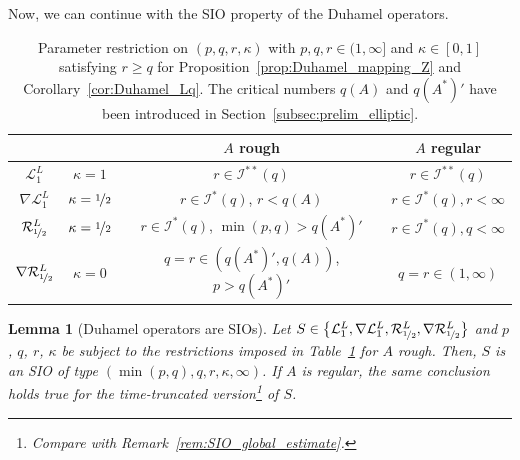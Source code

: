 \documentclass[11pt, leqno]{amsart}
\newtheorem{lemma}[theorem]{Lemma}
\theoremstyle{definition}
\newcommand{\Sol}{\mathcal{R}}
\newcommand{\Soll}{\mathcal{L}}
\newcommand{\SobSet}{\mathcal{I}}
\begin{document}
	Now, we can continue with the SIO property of the Duhamel operators.

	\begin{table}
		\centering
		\begin{tabular}{ c | c |c c }
			& & $A$ rough & $A$ regular \\
			\hline
			$\Soll^L_1$ & $\kappa = 1$ & $r \in \SobSet^{**}(q)$ & $r \in \SobSet^{**}(q)$ \\
			$\nabla \Soll^L_1$ & $\kappa = \nicefrac{1}{2}$ & $r \in \SobSet^{*}(q)$, $r < q(A)$ & $r \in \SobSet^{*}(q), {r<\infty}$ \\
			$\Sol^L_{\nicefrac{1}{2}}$ & $\kappa = \nicefrac{1}{2}$ & $r \in \SobSet^*(q)$, $\min(p,q) > q(A^*)'$ & $r \in \SobSet^*(q), {q<\infty}$ \\
			$\nabla \Sol^L_{\nicefrac{1}{2}}$ & $\kappa = 0$ & $q = r \in (q(A^*)', q(A))$, $p > q(A^*)'$ & $q = r \in (1,\infty)$ \\
		\end{tabular}
		\vspace{1em}
		\caption{Parameter restriction on $(p, q, r, \kappa)$ with $p,q,r \in (1,\infty]$ and $\kappa \in [0,1]$ satisfying $r \geq q$ for Proposition~\ref{prop:Duhamel_mapping_Z} and Corollary~\ref{cor:Duhamel_Lq}. {The critical numbers $q(A)$ and $q(A^*)'$ have been introduced in Section~\ref{subsec:prelim_elliptic}.}}
		\label{tab:Duhamel_Sobolev}
	\end{table}

	\begin{lemma}[Duhamel operators are SIOs]
		\label{lem:Duhamel_is_SIO}
		Let $S \in \bigl\{ \Soll^L_1, \nabla \Soll^L_1, \Sol^L_{\nicefrac{1}{2}}, \nabla \Sol^L_{\nicefrac{1}{2}} \bigr\}$ and $p$, $q$, $r$, $\kappa$ be subject to the restrictions imposed in Table~\ref{tab:Duhamel_Sobolev} for $A$ rough. Then, $S$ is an SIO of type $(\min(p,q),q,r,\kappa,\infty)$. If $A$ is regular, the same conclusion holds true for the time-truncated version\footnote{Compare with Remark~\ref{rem:SIO_global_estimate}.} of $S$.
	\end{lemma}
\end{document}
